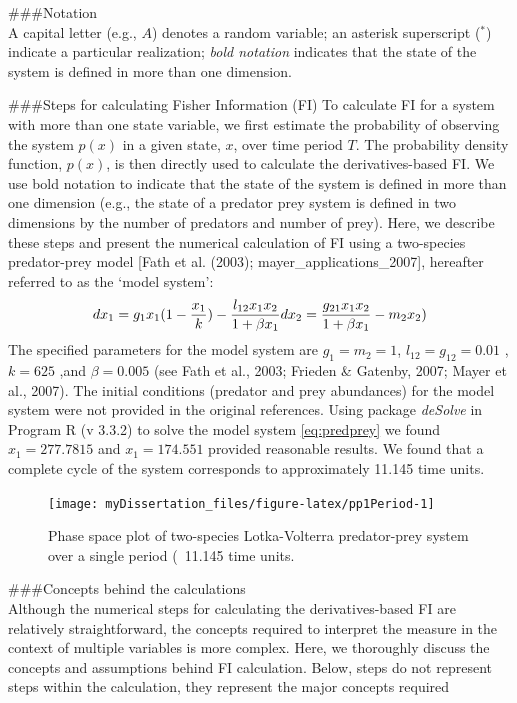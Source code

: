 \documentclass[12pt,twoside]{reedthesis}
\begin{document}
\#\#\#Notation\\
A capital letter (e.g., \(A\)) denotes a random variable; an asterisk superscript (\(^*\)) indicate a particular realization; \emph{bold notation} indicates that the state of the system is defined in more than one dimension.

\#\#\#Steps for calculating Fisher Information (FI)
To calculate FI for a system with more than one state variable, we first estimate the probability of observing the system \(p(x)\) in a given state, \(x\), over time period \(T\). The probability density function, \(p(x)\), is then directly used to calculate the derivatives-based FI. We use bold notation to indicate that the state of the system is defined in more than one dimension (e.g., the state of a predator prey system is defined in two dimensions by the number of predators and number of prey). Here, we describe these steps and present the numerical calculation of FI using a two-species predator-prey model {[}Fath et al. (2003); mayer\_applications\_2007{]}, hereafter referred to as the `model system':
\begin{equation} 
  dx_1 = g_{1}x_{1}(1-\frac{x_1}{k})- \frac{l_{12} x_{1} x_{2}}{1+\beta x_{1}} \\
  dx_2 = \frac{g_{21}x_1 x_2}{1+\beta x_1} - m_2 x_2) \\
  \label{eq:predprey}
\end{equation}
The specified parameters for the model system are \(g_1=m_2=1\), \(l_12=g_12 = 0.01\) , \(k=625\) ,and \(\beta=0.005\) (see Fath et al., 2003; Frieden \& Gatenby, 2007; Mayer et al., 2007). The initial conditions (predator and prey abundances) for the model system were not provided in the original references. Using package \emph{deSolve} in Program R (v 3.3.2) to solve the model system \eqref{eq:predprey} we found \(x_1 = 277.7815\) and \(x_1= 174.551\) provided reasonable results. We found that a complete cycle of the system corresponds to approximately 11.145 time units.
\begin{figure}

{\centering \texttt{[image: myDissertation\_files/figure-latex/pp1Period-1]} 

}

\caption{Phase space plot of two-species Lotka-Volterra predator-prey system over a single period (~11.145 time units.}\label{fig:pp1Period}
\end{figure}
\#\#\#Concepts behind the calculations\\
Although the numerical steps for calculating the derivatives-based FI are relatively straightforward, the concepts required to interpret the measure in the context of multiple variables is more complex. Here, we thoroughly discuss the concepts and assumptions behind FI calculation. Below, steps do not represent steps within the calculation, they represent the major concepts required
\end{document}
